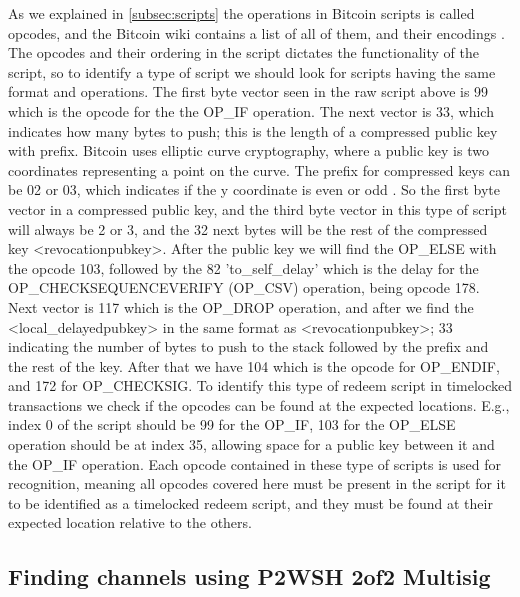 As we explained in \cref{subsec:scripts} the operations in Bitcoin scripts is called opcodes, and the Bitcoin wiki contains a list of all of them, and their encodings \cite{bitcoin_wiki_scripts}. The opcodes and their ordering in the script dictates the functionality of the script, so to identify a type of script we should look for scripts having the same format and operations.
The first byte vector seen in the raw script above is 99 which is the opcode for the the OP\_IF operation. The next vector is 33, which indicates how many bytes to push; this is the length of a compressed public key with prefix. Bitcoin uses elliptic curve cryptography, where a public key is two coordinates representing a point on the curve. The prefix for compressed keys can be 02 or 03, which indicates if the y coordinate is even or odd \cite{antonopoulos2017mastering}. So the first byte vector in a compressed public key, and the third byte vector in this type of script will always be 2 or 3, and the 32 next bytes will be the rest of the compressed key <revocationpubkey>. After the public key we will find the OP\_ELSE with the opcode 103, followed by the 82 'to\_self\_delay' which is the delay for the OP\_CHECKSEQUENCEVERIFY (OP\_CSV) operation, being opcode 178. 
Next vector is 117 which is the OP\_DROP operation, and after we find the <local\_delayedpubkey> in the same format as <revocationpubkey>; 33 indicating the number of bytes to push to the stack followed by the prefix and the rest of the key. After that we have 104 which is the opcode for OP\_ENDIF, and 172 for OP\_CHECKSIG.
To identify this type of redeem script in timelocked transactions we check if the opcodes can be found at the expected locations. E.g., index 0 of the script should be 99 for the OP\_IF, 103 for the OP\_ELSE operation should be at index 35, allowing space for a public key between it and the OP\_IF operation. Each opcode contained in these type of scripts is used for recognition, meaning all opcodes covered here must be present in the script for it to be identified as a timelocked redeem script, and they must be found at their expected location relative to the others.
\\


\subsection{Finding channels using P2WSH 2of2 Multisig}
\label{detection_ms}

